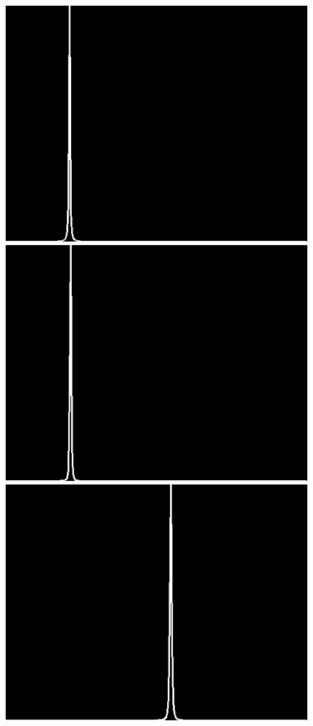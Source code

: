 \documentclass[12pt]{report}
\begin{document}
\begin{figure}[H]
\begin{center}
\includegraphics[scale=0.25]{../ImageRes/blockdct_histo_0.jpg} 
\includegraphics[scale=0.25]{../ImageRes/blockdct_histo_1.jpg} 
\includegraphics[scale=0.25]{../ImageRes/blockdct_histo_2.jpg} 

\end{center}
\end{figure}
\end{document}
